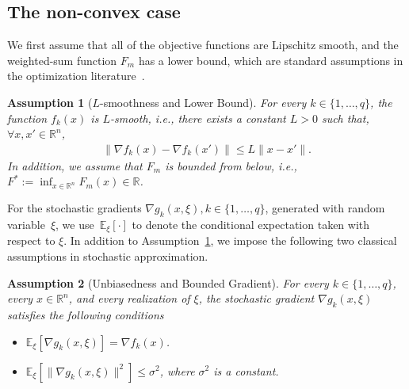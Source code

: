 \documentclass[11pt,a4paper]{article}
\numberwithin{equation}{section}%
\newtheorem{assumption}{Assumption}[section]
\renewcommand{\(}{\left (}
\renewcommand{\)}{\right )}
\newcommand{\Lphif}{L}
\newcommand{\Lf}{L_f}
\newcommand{\Fm}{F_m}
\begin{document}
\subsection{The non-convex case}
We first assume that all of the objective functions are Lipschitz smooth, and the weighted-sum function $F_m$ has a lower bound, which are standard assumptions in the optimization literature~\cite{bertsekas1997nonlinear}. 
\begin{assumption}[$\Lphif$-smoothness and Lower Bound]\label{assump:L}
For every $k \in \{ 1, \dots, q\}$, the function 
$f_k(x)$ is $\Lphif$-smooth, i.e., there exists a constant $\Lphif>0$ such that, $\forall x, x' \in \mathbb{R}^n$,
\begin{align*}
\|\nabla f_k(x) - \nabla f_k(x')\| \le \Lphif \|x - x'\|.
\end{align*}
In addition, we %
assume that $\Fm$ is bounded from below, i.e., $F^* := \inf_{x\in \mathbb{R}^n} \Fm(x) \in \mathbb{R}$. 

\end{assumption}
For the stochastic gradients $\nabla g_k(x,\xi), k \in \{ 1, \dots, q\}$, generated with random variable~$\xi$, we use~$\mathbb{E}_{\xi}[\cdot]$ to denote the conditional expectation taken with respect to $\xi$. In addition to Assumption~\ref{assump:L}, we impose the following two classical assumptions in stochastic approximation.  
\begin{assumption}[Unbiasedness and Bounded Gradient]\label{assump:conds}
For every $k \in \{ 1, \dots, q\}$, every $x \in \mathbb{R}^n$,
and every realization of $\xi$, the stochastic gradient $\nabla g_k(x,\xi)$ satisfies the following conditions
\begin{itemize}
\item[(a)] %
$\mathbb{E}_{\xi} \left[\nabla g_k(x,\xi)\right] = \nabla f_k(x)$.
\item[(b)] %
$\mathbb{E}_{\xi}[\|\nabla g_k(x,\xi)\|^2] \leq \sigma^2$, where $\sigma^2$ is a constant. 
\end{itemize} 
\end{assumption}
\end{document}

